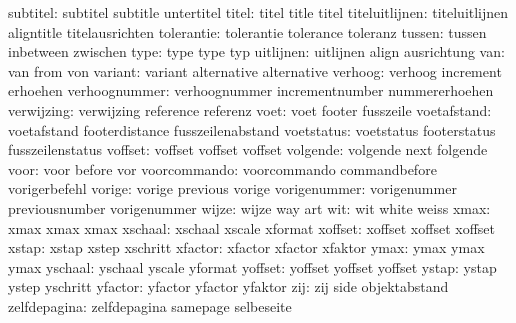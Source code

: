            subtitel:  subtitel             subtitle            untertitel
              titel:  titel                title               titel
     titeluitlijnen:  titeluitlijnen       aligntitle          titelausrichten
         tolerantie:  tolerantie           tolerance           toleranz
             tussen:  tussen               inbetween           zwischen
               type:  type                 type                typ
          uitlijnen:  uitlijnen            align               ausrichtung
                van:  van                  from                von
            variant:  variant              alternative         alternative
            verhoog:  verhoog              increment           erhoehen
      verhoognummer:  verhoognummer        incrementnumber     nummererhoehen
         verwijzing:  verwijzing           reference           referenz
               voet:  voet                 footer              fusszeile
        voetafstand:  voetafstand          footerdistance      fusszeilenabstand
         voetstatus:  voetstatus           footerstatus        fusszeilenstatus
            voffset:  voffset              voffset             voffset
           volgende:  volgende             next                folgende
               voor:  voor                 before              vor
       voorcommando:  voorcommando         commandbefore       vorigerbefehl
             vorige:  vorige               previous            vorige
       vorigenummer:  vorigenummer         previousnumber      vorigenummer
              wijze:  wijze                way                 art
                wit:  wit                  white               weiss
               xmax:  xmax                 xmax                xmax
            xschaal:  xschaal              xscale              xformat
            xoffset:  xoffset              xoffset             xoffset
              xstap:  xstap                xstep               xschritt
            xfactor:  xfactor              xfactor             xfaktor
               ymax:  ymax                 ymax                ymax
            yschaal:  yschaal              yscale              yformat
            yoffset:  yoffset              yoffset             yoffset
              ystap:  ystap                ystep               yschritt
            yfactor:  yfactor              yfactor             yfaktor
                zij:  zij                  side                objektabstand
       zelfdepagina:  zelfdepagina         samepage            selbeseite

\stopconstants


